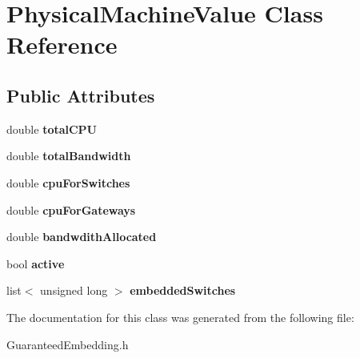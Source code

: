 \hypertarget{classPhysicalMachineValue}{\section{\-Physical\-Machine\-Value \-Class \-Reference}
\label{classPhysicalMachineValue}
}
\subsection*{\-Public \-Attributes}
\begin{DoxyCompactItemize}
\item 
\hypertarget{classPhysicalMachineValue_a48290a8a78307c557dd8ee8cb101b9fd}{double {\bfseries total\-C\-P\-U}}\label{classPhysicalMachineValue_a48290a8a78307c557dd8ee8cb101b9fd}

\item 
\hypertarget{classPhysicalMachineValue_adb1baf10d71a69a36932724a7382f72a}{double {\bfseries total\-Bandwidth}}\label{classPhysicalMachineValue_adb1baf10d71a69a36932724a7382f72a}

\item 
\hypertarget{classPhysicalMachineValue_a6bcad783b338d24f152c4b74e8605e92}{double {\bfseries cpu\-For\-Switches}}\label{classPhysicalMachineValue_a6bcad783b338d24f152c4b74e8605e92}

\item 
\hypertarget{classPhysicalMachineValue_a973156588420fbc11c19de09c5c8a2f4}{double {\bfseries cpu\-For\-Gateways}}\label{classPhysicalMachineValue_a973156588420fbc11c19de09c5c8a2f4}

\item 
\hypertarget{classPhysicalMachineValue_abd4c9996ac87c660f21fb2f3cc56c5ef}{double {\bfseries bandwdith\-Allocated}}\label{classPhysicalMachineValue_abd4c9996ac87c660f21fb2f3cc56c5ef}

\item 
\hypertarget{classPhysicalMachineValue_a6361460b14f70b869f3b80c292d8b9e1}{bool {\bfseries active}}\label{classPhysicalMachineValue_a6361460b14f70b869f3b80c292d8b9e1}

\item 
\hypertarget{classPhysicalMachineValue_af7f1700e9174f93ce4ce5ca2d44d7ac8}{list$<$ unsigned long $>$ {\bfseries embedded\-Switches}}\label{classPhysicalMachineValue_af7f1700e9174f93ce4ce5ca2d44d7ac8}

\end{DoxyCompactItemize}


\-The documentation for this class was generated from the following file\-:\begin{DoxyCompactItemize}
\item 
\-Guaranteed\-Embedding.\-h\end{DoxyCompactItemize}
